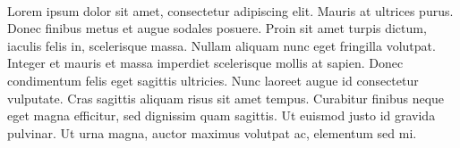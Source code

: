 \paragraph{} 
Lorem ipsum dolor sit amet, consectetur adipiscing elit. Mauris at ultrices purus. Donec finibus metus et augue sodales posuere. Proin sit amet turpis dictum, iaculis felis in, scelerisque massa. Nullam aliquam nunc eget fringilla volutpat. Integer et mauris et massa imperdiet scelerisque mollis at sapien. Donec condimentum felis eget sagittis ultricies. Nunc laoreet augue id consectetur vulputate. Cras sagittis aliquam risus sit amet tempus. Curabitur finibus neque eget magna efficitur, sed dignissim quam sagittis. Ut euismod justo id gravida pulvinar. Ut urna magna, auctor maximus volutpat ac, elementum sed mi.

